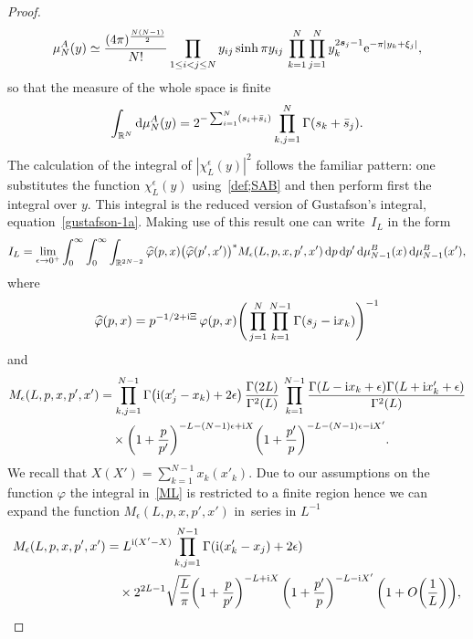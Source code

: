 \begin{proof}
\begin{gather*}
\mu^A_N(y) \simeq \frac{(4\pi)^{\frac{N(N-1)}2}}{ N!}
\prod_{1\leq i<j\leq N} y_{ij}\sinh\pi y_{ij}\, \prod_{k=1}^N\prod_{j=1}^N y_k^{2\boldsymbol s_j-1}{\rm e}^{-\pi|y_k+\xi_j|},
\end{gather*}
so that the measure of the whole space is finite
\begin{gather*}
\int_{\mathbb R^N}{\rm d}\mu_N^A(y)=2^{-\sum_{i=1}^N (s_i+\bar s_i)}\prod_{k,j=1}^N\Gamma(s_k+\bar s_j).
\end{gather*}
The calculation of the integral of $|\chi_L^\epsilon(y)|^2$ follows the familiar pattern: one substitutes the function $\chi^\epsilon_L(y)$
using~\eqref{def;SAB} and then perform first the integral over $y$. This integral is the reduced version of Gustafson's integral,
equation~\eqref{gustafson-1a}. Making use of this result one can write~$I_L$ in the form
\begin{gather*}
I_L=\lim_{\epsilon\to 0^+}\int_0^\infty \int_0^\infty \int_{\mathbb R^{2N-2}}\widehat \varphi(p,x)\big(\widehat\varphi(p',x')\big)^*
 M_\epsilon(L,p,x,p',x') \,{\rm d}p \,{\rm d}p' \,{\rm d}\mu_{N-1}^B(x)\,{\rm d}\mu_{N-1}^B(x'),
\end{gather*}
where
\begin{gather*}
\widehat\varphi(p,x)=p^{-1/2+{\rm i}\Xi}\,{\varphi(p,x)}\Bigg(\prod_{j=1}^N\prod_{k=1}^{N-1} \Gamma(s_j-{\rm i}x_k)\Bigg)^{-1}
\end{gather*}
and
\begin{align}
M_\epsilon(L,p,x,p',x')&
=\prod_{k,j=1}^{N-1}\Gamma\big({\rm i}(x'_j-x_k)+2\epsilon\big)\,\frac{\Gamma(2L)}{\Gamma^2(L)}\,
\prod_{k=1}^{N-1} \frac{\Gamma(L-{\rm i}x_k+\epsilon) \Gamma(L+{\rm i}x'_k+\epsilon)}{\Gamma^2(L)}\notag
\\
&\quad\times \bigg(1+\frac p{p'}\bigg)^{-L-(N-1)\epsilon+{\rm i}X}
\bigg(1+\frac{p'}p\bigg)^{-L-(N-1)\epsilon-{\rm i}X'}.\label{ML}
\end{align}
We recall that $X(X')=\sum_{k=1}^{N-1}x_k (x'_k)$. Due to our assumptions on the function $\varphi$ the integral in~\eqref{ML} is
restricted to a finite region hence we can expand the function $M_\epsilon(L,p,x,p',x')$ in~series in $L^{-1}$
\begin{align}\label{MLL}
M_\epsilon(L,p,x,p',x') & =L^{{\rm i}(X'-X)}\prod_{k,j=1}^{N-1}\Gamma({\rm i}(x'_k-x_j)+2\epsilon)
\notag\\
&\quad\times
 2^{2L-1}
\sqrt{\frac{L}\pi}\bigg(1+\frac p{p'}\bigg)^{-L+{\rm i}X}
\,\bigg(1+\frac{p'}p\bigg)^{-L-{\rm i}X'} \,\bigg(1+O\bigg(\frac1L\bigg)\bigg),

\end{align}
\end{proof}
